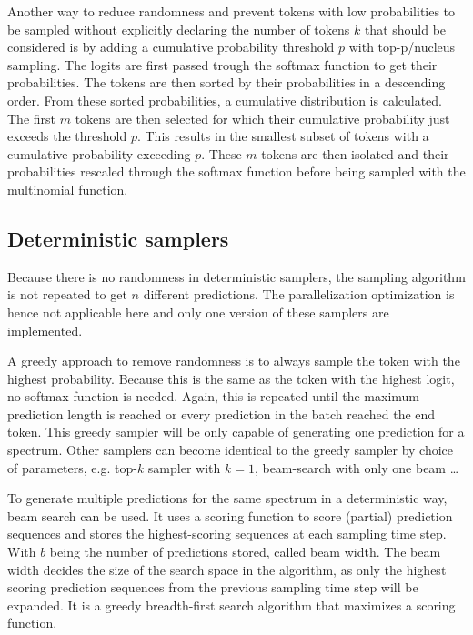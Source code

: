 Another way to reduce randomness and prevent tokens with low probabilities to be sampled without explicitly declaring the number of tokens $k$ that should be considered is by adding a cumulative probability threshold $p$ with top-p/nucleus sampling.
The logits are first passed trough the softmax function to get their probabilities.
The tokens are then sorted by their probabilities in a descending order.
From these sorted probabilities, a cumulative distribution is calculated.
The first $m$ tokens are then selected for which their cumulative probability just exceeds the threshold $p$.
This results in the smallest subset of tokens with a cumulative probability exceeding $p$.
These $m$ tokens are then isolated and their probabilities rescaled through the softmax function before being sampled with the multinomial function.

\subsection{Deterministic samplers}

Because there is no randomness in deterministic samplers, the sampling algorithm is not repeated to get $n$ different predictions. The parallelization optimization is hence not applicable here and only one version of these samplers are implemented.

A greedy approach to remove randomness is to always sample the token with the highest probability. Because this is the same as the token with the highest logit, no softmax function is needed.
Again, this is repeated until the maximum prediction length is reached or every prediction in the batch reached the end token.
This greedy sampler will be only capable of generating one prediction for a spectrum.
Other samplers can become identical to the greedy sampler by choice of parameters, e.g. top-$k$ sampler with $k=1$, beam-search with only one beam \ldots

To generate multiple predictions for the same spectrum in a deterministic way, beam search can be used.
It uses a scoring function to score (partial) prediction sequences and stores the highest-scoring sequences at each sampling time step.
With $b$ being the number of predictions stored, called beam width.
The beam width decides the size of the search space in the algorithm, as only the highest scoring prediction sequences from the previous sampling time step will be expanded.
It is a greedy breadth-first search algorithm that maximizes a scoring function.

